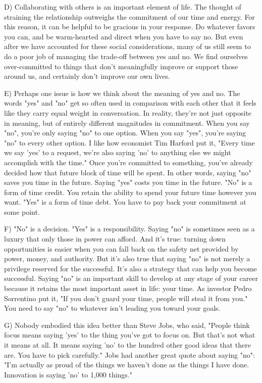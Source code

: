 \documentclass[UTF8,11pt]{ctexart}
\begin{document}
D) Collaborating with others is an important element of life. The thought of straining the relationship outweighs the commitment of our time and energy. For this reason, it can be helpful to be gracious in your response. Do whatever favors you can, and be warm-hearted and direct when you have to say no. But even after we have accounted for these social considerations, many of us still seem to do a poor job of managing the trade-off between yes and no. We find ourselves over-committed to things that don't meaningfully improve or support those around us, and certainly don't improve our own lives.


E) Perhaps one issue is how we think about the meaning of yes and no. The words "yes" and "no" get so often used in comparison with each other that it feels like they carry equal weight in conversation. In reality, they're not just opposite in meaning, but of entirely different magnitudes in commitment. When you say "no", you're only saying "no" to one option. When you say "yes", you're saying "no" to every other option. I like how economist Tim Harford put it, "Every time we say 'yes' to a request, we're also saying 'no' to anything else we might accomplish with the time." Once you're committed to something, you've already decided how that future block of time will be spent. In other words, saying "no" saves you time in the future. Saying "yes" costs you time in the future. "No" is a form of time credit. You retain the ability to spend your future time however you want. "Yes" is a form of time debt. You have to pay back your commitment at some point.


F) "No" is a decision. "Yes" is a responsibility. Saying "no" is sometimes seen as a luxury that only those in power can afford. And it's true: turning down opportunities is easier when you can fall back on the safety net provided by power, money, and authority. But it's also true that saying "no" is not merely a privilege reserved for the successful. It's also a strategy that can help you become successful. Saying "no" is an important skill to develop at any stage of your career because it retains the most important asset in life: your time. As investor Pedro Sorrentino put it, "If you don't guard your time, people will steal it from you." You need to say "no" to whatever isn't leading you toward your goals.


G) Nobody embodied this idea better than Steve Jobs, who said, "People think focus means saying 'yes' to the thing you've got to focus on. But that's not what it means at all. It means saying 'no' to the hundred other good ideas that there are. You have to pick carefully." Jobs had another great quote about saying "no": "I'm actually as proud of the things we haven't done as the things I have done. Innovation is saying 'no' to 1,000 things."
\end{document}
